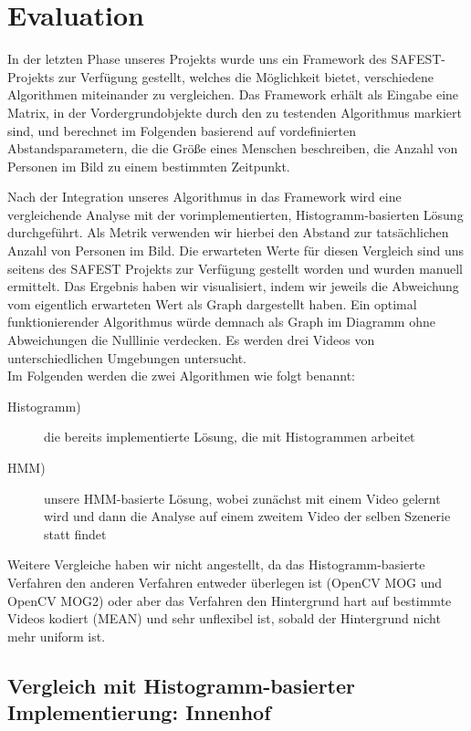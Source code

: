 \section{Evaluation}
\label{chap:evaluation}
In der letzten Phase unseres Projekts wurde uns ein Framework des SAFEST-Projekts zur Verfügung gestellt, welches die Möglichkeit bietet, verschiedene Algorithmen miteinander zu vergleichen. Das Framework erhält als Eingabe eine Matrix, in der Vordergrundobjekte durch den zu testenden  Algorithmus markiert sind, und berechnet im Folgenden basierend auf vordefinierten Abstandsparametern, die die Größe eines Menschen beschreiben, die Anzahl von Personen im Bild zu einem bestimmten Zeitpunkt.

Nach der Integration unseres Algorithmus in das Framework wird eine vergleichende Analyse mit der vorimplementierten, Histogramm-basierten Lösung durchgeführt. Als Metrik verwenden wir hierbei den Abstand zur tatsächlichen Anzahl von Personen im Bild. Die erwarteten Werte für diesen Vergleich sind uns seitens des SAFEST Projekts zur Verfügung gestellt worden und wurden manuell ermittelt. Das Ergebnis haben wir visualisiert, indem wir jeweils die Abweichung vom eigentlich erwarteten Wert als Graph dargestellt haben. Ein optimal funktionierender Algorithmus würde demnach als Graph im Diagramm ohne Abweichungen die Nulllinie verdecken. Es werden drei Videos von unterschiedlichen Umgebungen untersucht.\\
Im Folgenden werden die zwei Algorithmen wie folgt benannt:
\begin{description}
	\item[Histogramm)] die bereits implementierte Lösung, die mit Histogrammen arbeitet
	\item[HMM)] unsere HMM-basierte Lösung, wobei zunächst mit einem Video gelernt wird und dann die Analyse auf einem zweitem Video der selben Szenerie statt findet
\end{description}
Weitere Vergleiche haben wir nicht angestellt, da das Histogramm-basierte Verfahren den anderen Verfahren entweder überlegen ist (OpenCV MOG und OpenCV MOG2) oder aber das Verfahren den Hintergrund hart auf bestimmte Videos kodiert (MEAN) und sehr unflexibel ist, sobald der Hintergrund nicht mehr uniform ist.

\subsection{Vergleich mit Histogramm-basierter Implementierung: Innenhof}
\label{sec:eval_innenhof}


